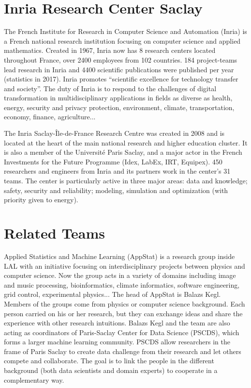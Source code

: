 \section{Inria Research Center Saclay}
The French Institute for Research in Computer Science and Automation (Inria) is a French national research institution focusing on computer science and applied mathematics. Created in 1967, Inria now has 8 research centers located throughout France, over 2400 employees from 102 countries. 184 project-teams lead research in Inria and 4400 scientific publications were published per year (statistics in 2017)\cite{inria_statistics}. Inria promotes “scientific excellence for technology transfer and society”. The duty of Inria is to respond to the challenges of digital transformation in multidisciplinary applications in fields as diverse as health, energy, security and privacy protection, environment, climate, transportation, economy, finance, agriculture...

The Inria Saclay-Île-de-France Research Centre was created in 2008 and is located at the heart of the main national research and higher education cluster. It is also a member of the Université Paris Saclay, and a major actor in the French Investments for the Future Programme (Idex, LabEx, IRT, Equipex). 450 researchers and engineers from Inria and its partners work in the center's 31 teams. The center is particularly active in three major areas: data and knowledge; safety, security and reliability; modeling, simulation and optimization (with priority given to energy)\cite{inria_overview}.

\section{Related Teams}
\label{teams}
Applied Statistics and Machine Learning (AppStat) is a research group inside LAL with an initiative focusing on interdisciplinary projects between physics and computer science. Now the group acts in a variety of domains including image and music processing, bioinformatics, climate informatics, software engineering, grid control, experimental physics... The head of AppStat is Balazs Kegl. Members of the groups come from physics or computer science background. Each person carried on his or her research, but they can exchange ideas and share the experience with other research intuitions. Balazs Kegl and the team are also acting as coordinators of Paris-Saclay Center for Data Science (PSCDS), which forms a larger machine learning community. PSCDS allow researchers in the frame of Paris Saclay to create data challenge from their research and let others compete and collaborate. The goal is to link the people in the different background (both data scientists and domain experts) to cooperate in a complementary way\cite{balazs-kegl}.  

